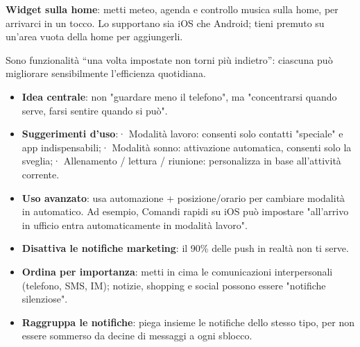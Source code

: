 \textbf{Widget sulla home}: metti meteo, agenda e controllo musica sulla home, per arrivarci in un tocco. Lo supportano sia iOS che Android; tieni premuto su un'area vuota della home per aggiungerli.


Sono funzionalità “una volta impostate non torni più indietro”: ciascuna può migliorare sensibilmente l'efficienza quotidiana.


\begin{itemize}
  \item \textbf{Idea centrale}: non "guardare meno il telefono", ma "concentrarsi quando serve, farsi sentire quando si può".
  \item \textbf{Suggerimenti d'uso}:\newline · Modalità lavoro: consenti solo contatti "speciale" e app indispensabili;\newline · Modalità sonno: attivazione automatica, consenti solo la sveglia;\newline · Allenamento / lettura / riunione: personalizza in base all'attività corrente.
  \item \textbf{Uso avanzato}: usa automazione + posizione/orario per cambiare modalità in automatico. Ad esempio, Comandi rapidi su iOS può impostare "all'arrivo in ufficio entra automaticamente in modalità lavoro".
\end{itemize}


\begin{itemize}
  \item \textbf{Disattiva le notifiche marketing}: il 90\% delle push in realtà non ti serve.
  \item \textbf{Ordina per importanza}: metti in cima le comunicazioni interpersonali (telefono, SMS, IM); notizie, shopping e social possono essere "notifiche silenziose".
  \item \textbf{Raggruppa le notifiche}: piega insieme le notifiche dello stesso tipo, per non essere sommerso da decine di messaggi a ogni sblocco.
\end{itemize}


